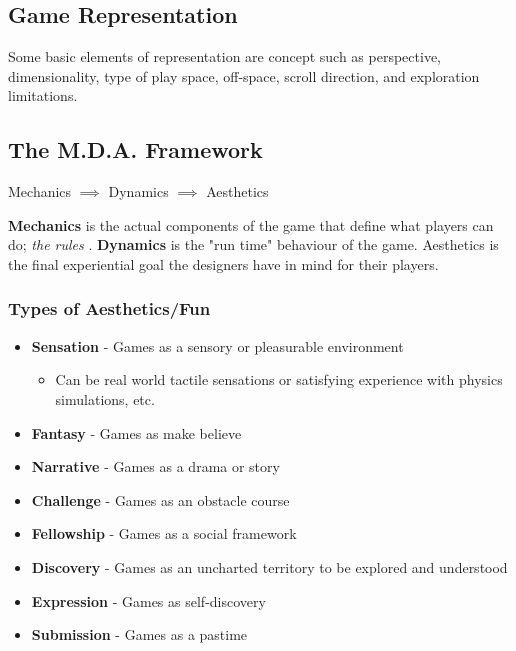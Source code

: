 \documentclass{standalone}
\begin{document}
\subsection{Game Representation}

Some basic elements of representation are concept such as perspective, dimensionality, type of play space, off-space, scroll direction, and exploration limitations.

\subsection{The M.D.A. Framework}

\centerline{Mechanics $\implies$ Dynamics $\implies$ Aesthetics}
\textbf{Mechanics} is the actual components of the game that define what players can do; \textit{the rules
}. \textbf{Dynamics} is the "run time" behaviour of the game. Aesthetics is the final experiential goal the designers have in mind for their players.

\subsubsection{Types of Aesthetics/Fun}

\begin{itemize}
				\tightlist
				\item \textbf{Sensation} - Games as a sensory or pleasurable environment
				\begin{itemize}
								\item Can be real world tactile sensations or satisfying experience with physics simulations, etc.
				\end{itemize}
				\item \textbf{Fantasy} - Games as make believe
				\item \textbf{Narrative} - Games as a drama or story
				\item \textbf{Challenge} - Games as an obstacle course
				\item \textbf{Fellowship} - Games as a social framework
				\item \textbf{Discovery} - Games as an uncharted territory to be explored and understood
				\item \textbf{Expression} - Games as self-discovery
				\item \textbf{Submission} - Games as a pastime
\end{itemize}
\end{document}
